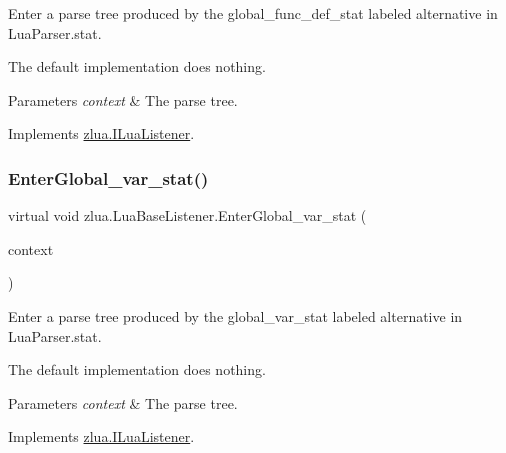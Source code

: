 Enter a parse tree produced by the {\ttfamily global\+\_\+func\+\_\+def\+\_\+stat} labeled alternative in Lua\+Parser.\+stat. 

The default implementation does nothing.


\begin{DoxyParams}{Parameters}
{\em context} & The parse tree.\\
\hline
\end{DoxyParams}


Implements \mbox{\hyperlink{interfacezlua_1_1_i_lua_listener_add4d956e68d0679849896d682e181800}{zlua.\+I\+Lua\+Listener}}.

\mbox{\label{classzlua_1_1_lua_base_listener_a67f5bfdbc89b494e4e8474ba4d019326}} 
\subsubsection{\texorpdfstring{Enter\+Global\+\_\+var\+\_\+stat()}{EnterGlobal\_var\_stat()}}
{\footnotesize\ttfamily virtual void zlua.\+Lua\+Base\+Listener.\+Enter\+Global\+\_\+var\+\_\+stat (\begin{DoxyParamCaption}\item[{\mbox{[}\+Not\+Null\mbox{]} \mbox{\hyperlink{classzlua_1_1_lua_parser_1_1_global__var__stat_context}{Lua\+Parser.\+Global\+\_\+var\+\_\+stat\+Context}}}]{context }\end{DoxyParamCaption})\hspace{0.3cm}{\ttfamily [virtual]}}



Enter a parse tree produced by the {\ttfamily global\+\_\+var\+\_\+stat} labeled alternative in Lua\+Parser.\+stat. 

The default implementation does nothing.


\begin{DoxyParams}{Parameters}
{\em context} & The parse tree.\\
\hline
\end{DoxyParams}


Implements \mbox{\hyperlink{interfacezlua_1_1_i_lua_listener_a7a5992193e5625f3c6d07fcc05f3ce4c}{zlua.\+I\+Lua\+Listener}}.

